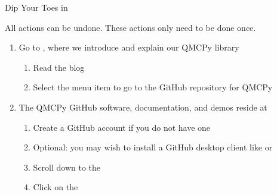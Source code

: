 \documentclass[10pt,compress,xcolor={usenames,dvipsnames},aspectratio=169]{beamer}
\begin{document}
\begin{frame}{Dip Your Toes in}

\vspace{-5ex}
All actions can be undone.  These actions only need to be done once.

\vspace{-2ex}
\begin{enumerate}
    \item Go to \href{https://qmcpy.org}{}, where we introduce and explain our QMCPy library 
    \begin{enumerate}[a]
        \item Read the blog \href{https://qmcpy.org/2020/06/25/why_add_q_to_mc/}{}
        \item Select the menu item \href{https://github.com/QMCSoftware/QMCSoftware}{} to go to the GitHub repository for QMCPy
    \end{enumerate}
    
    \item The QMCPy GitHub software, documentation, and demos reside at \href{https://github.com/QMCSoftware/QMCSoftware}{}
    \begin{enumerate}[a]
        \item Create a GitHub account if you do not have one
        \item Optional: you may wish to install a GitHub desktop client like \href{https://desktop.github.com}{} or \href{https://www.gitkraken.com}{}
        \item Scroll down to the \href{https://github.com/QMCSoftware/QMCSoftware/\#readme}{} 
        \item Click on the \href{https://github.com/QMCSoftware/QMCSoftware/blob/master/CONTRIBUTING.md}{}
    \end{enumerate}


\end{enumerate}
\end{frame}
\end{document}
